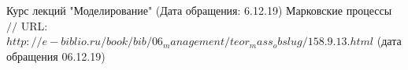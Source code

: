 \makeatletter \renewcommand{} \makeatother
\renewcommand\refname{Список использованных источников}
\begin{thebibliography}{00}
	
	Курс лекций "Моделирование" (Дата обращения: 6.12.19)
	Марковские процессы $//$ URL: $http://e-biblio.ru/book/bib/06_management/teor_mass_obslug/158.9.13.html$ (дата обращения 06.12.19)
\end{thebibliography}
